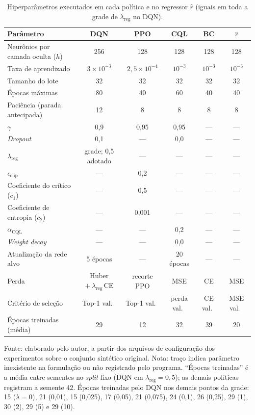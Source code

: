 \begin{table}[htbp]
\centering
\caption[Hiperparâmetros das políticas e do regressor]{Hiperparâmetros executados em cada política e no regressor $\hat{r}$ (iguais em toda a grade de $\lambda_{\text{reg}}$ no DQN).}
\label{tab:hiperparametros_apendice}
\small\setlength{\tabcolsep}{3.5pt}
\begin{tabular}{lccccc}
\hline
\textbf{Parâmetro} & \textbf{DQN} & \textbf{PPO} & \textbf{CQL} & \textbf{BC} & $\hat{r}$ \\
\hline
Neurônios por camada oculta ($h$) & 256 & 128 & 128 & 128 & 128 \\
Taxa de aprendizado & $3 \times 10^{-3}$ & $2{,}5 \times 10^{-4}$ & $10^{-3}$ & $10^{-3}$ & $10^{-3}$ \\
Tamanho do lote & 32 & 32 & 32 & 32 & 32 \\
Épocas máximas & 80 & 40 & 60 & 40 & 40 \\
Paciência (parada antecipada) & 12 & 8 & 8 & 8 & 8 \\
$\gamma$ & 0,9 & 0,95 & 0,95 & --- & --- \\
\textit{Dropout} & 0,1 & --- & 0,0 & --- & --- \\
$\lambda_{\text{reg}}$ & grade; 0,5 adotado & --- & --- & --- & --- \\
$\epsilon_{\text{clip}}$ & --- & 0,2 & --- & --- & --- \\
Coeficiente do crítico ($c_1$) & --- & 0,5 & --- & --- & --- \\
Coeficiente de entropia ($c_2$) & --- & 0,001 & --- & --- & --- \\
$\alpha_{\text{CQL}}$ & --- & --- & 0,2 & --- & --- \\
\textit{Weight decay} & --- & --- & 0,0 & --- & --- \\
Atualização da rede alvo & 5 épocas & --- & 20 épocas & --- & --- \\
Perda & Huber $+\ \lambda_{\text{reg}}\,$CE & recorte PPO & MSE & CE & MSE \\
Critério de seleção & Top-1 val.\ & Top-1 val.\ & perda val.\ & CE val.\ & MSE val.\ \\
Épocas treinadas (média) & 29 & 12 & 32 & 39 & 20 \\
\hline
\end{tabular}

\begin{minipage}{0.95\textwidth}
{\footnotesize Fonte: elaborado pelo autor, a partir dos arquivos de configuração dos experimentos sobre o conjunto sintético original. Nota: traço indica parâmetro inexistente na formulação ou não registrado pelo programa. ``Épocas treinadas'' é a média entre sementes no \textit{split} fixo (DQN em $\lambda_{\text{reg}} = 0{,}5$); as demais políticas registram a semente 42. Épocas treinadas pelo DQN nos demais pontos da grade: 15 ($\lambda = 0$), 21 (0,01), 15 (0,025), 17 (0,05), 21 (0,075), 24 (0,1), 26 (0,25), 29 (1), 30 (2), 29 (5) e 29 (10).}
\end{minipage}
\end{table}

